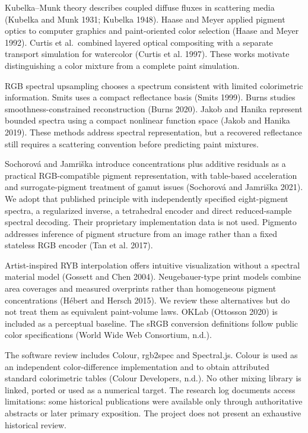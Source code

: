 \documentclass[
  10pt,
  twocolumn]{article}
\begin{document}
Kubelka--Munk theory describes coupled diffuse fluxes in scattering
media (Kubelka and Munk 1931; Kubelka 1948). Haase and Meyer applied
pigment optics to computer graphics and paint-oriented color selection
(Haase and Meyer 1992). Curtis et al.~combined layered optical
compositing with a separate transport simulation for watercolor (Curtis
et al. 1997). These works motivate distinguishing a color mixture from a
complete paint simulation.

RGB spectral upsampling chooses a spectrum consistent with limited
colorimetric information. Smits uses a compact reflectance basis (Smits
1999). Burns studies smoothness-constrained reconstruction (Burns 2020).
Jakob and Hanika represent bounded spectra using a compact nonlinear
function space (Jakob and Hanika 2019). These methods address spectral
representation, but a recovered reflectance still requires a scattering
convention before predicting paint mixtures.

Sochorová and Jamriška introduce concentrations plus additive residuals
as a practical RGB-compatible pigment representation, with table-based
acceleration and surrogate-pigment treatment of gamut issues (Sochorová
and Jamriška 2021). We adopt that published principle with independently
specified eight-pigment spectra, a regularized inverse, a tetrahedral
encoder and direct reduced-sample spectral decoding. Their proprietary
implementation data is not used. Pigmento addresses inference of pigment
structure from an image rather than a fixed stateless RGB encoder (Tan
et al. 2017).

Artist-inspired RYB interpolation offers intuitive visualization without
a spectral material model (Gossett and Chen 2004). Neugebauer-type print
models combine area coverages and measured overprints rather than
homogeneous pigment concentrations (Hébert and Hersch 2015). We review
these alternatives but do not treat them as equivalent paint-volume
laws. OKLab (Ottosson 2020) is included as a perceptual baseline. The
sRGB conversion definitions follow public color specifications (World
Wide Web Consortium, n.d.).

The software review includes Colour, rgb2spec and Spectral.js. Colour is
used as an independent color-difference implementation and to obtain
attributed standard colorimetric tables (Colour Developers, n.d.). No
other mixing library is linked, ported or used as a numerical target.
The research log documents access limitations: some historical
publications were available only through authoritative abstracts or
later primary exposition. The project does not present an exhaustive
historical review.
\end{document}
